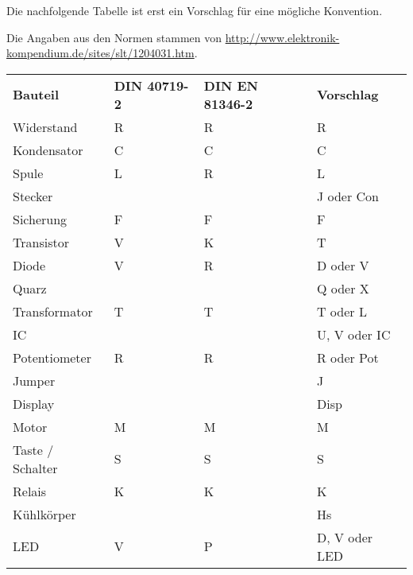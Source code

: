 Die nachfolgende Tabelle ist erst ein Vorschlag für eine mögliche Konvention. 

Die Angaben aus den Normen stammen von 
\url{http://www.elektronik-kompendium.de/sites/slt/1204031.htm}. 
\begin{table}[h!]
  \begin{tabular}{llll}
  \rowcolor{white}  \textbf{Bauteil} 	    
                                            & \textbf{DIN 40719-2} 
                                                    & \textbf{DIN EN 81346-2}          
                                                            & \textbf{Vorschlag}\\
  \rowcolor{lgray}  Widerstand              & R     & R     & R \\
  \rowcolor{white}  Kondensator             & C     & C     & C \\
  \rowcolor{lgray}  Spule                   & L     & R     & L \\
  \rowcolor{white}  Stecker                 &       &       & J oder Con \\
  \rowcolor{lgray}  Sicherung               & F     & F     & F \\
  \rowcolor{white}  Transistor              & V     & K     & T \\
  \rowcolor{lgray}  Diode                   & V     & R     & D oder V \\
  \rowcolor{white}  Quarz                   &       &       & Q oder X \\
  \rowcolor{lgray}  Transformator           & T     & T     & T oder L \\
  \rowcolor{white}  IC                      &       &       & U, V oder IC \\
  \rowcolor{lgray}  Potentiometer           & R     & R     & R oder Pot \\
  \rowcolor{white}  Jumper                  &       &       & J \\
  \rowcolor{lgray}  Display                 &       &       & Disp \\
  \rowcolor{white}  Motor                   & M     & M     & M \\
  \rowcolor{lgray}  Taste / Schalter        & S     & S     & S \\
  \rowcolor{white}  Relais                  & K     & K     & K \\
  \rowcolor{lgray}  Kühlkörper              &       &       & Hs \\
  \rowcolor{white}  LED                     & V     & P     & D, V oder LED \\

\end{tabular}
\end{table}
